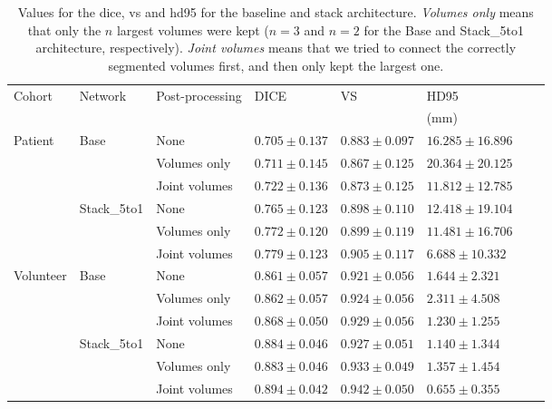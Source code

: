 \begin{table}[htbp]
   \centering
   \caption[Results for Post-processing]{Values for the \acrlong{dice}, \acrlong{vs} and \acrlong{hd95} for the baseline and stack architecture. \textit{Volumes only} means that only the $n$ largest volumes were kept ($n = 3$ and $n = 2$ for the Base and Stack\_5to1 architecture, respectively). \textit{Joint volumes} means that we tried to connect the correctly segmented volumes first, and then only kept the largest one.}
   \begin{tabular}{l*{7}{l}}
      \toprule
      Cohort	& Network	& Post-processing	& DICE				& VS				& HD95\\
      			&					&					&					&					& (mm)\\
      \midrule
      Patient   & Base 	& None & $0.705 \pm 0.137$ & $\mathbf{0.883 \pm 0.097}$ & $16.285 \pm 16.896$\\
                &                	& Volumes only  & $0.711 \pm 0.145$ & $0.867 \pm 0.125$ & $20.364 \pm 20.125$\\
                &                	& Joint volumes & $\mathbf{0.722 \pm 0.136}$ & $0.873 \pm 0.125$ & $\mathbf{11.812 \pm 12.785}$\\
      \cmidrule{2-6}
                & Stack\_5to1 	& None & $0.765 \pm 0.123$ & $0.898 \pm 0.110$ & $12.418 \pm 19.104$\\
                &                	& Volumes only  & $0.772 \pm 0.120$ & $0.899 \pm 0.119$ & $11.481 \pm 16.706$\\
                &                	& Joint volumes      & $\mathbf{0.779 \pm 0.123}$ & $\mathbf{0.905 \pm 0.117}$ & $\mathbf{6.688  \pm 10.332}$\\
      \midrule
      Volunteer & Base 	& None & $0.861 \pm 0.057$ & $0.921 \pm 0.056$ & $1.644  \pm 2.321 $\\
                &                	& Volumes only  & $0.862 \pm 0.057$ & $0.924 \pm 0.056$ & $2.311  \pm 4.508 $\\
                &                	& Joint volumes      & $\mathbf{0.868 \pm 0.050}$ & $\mathbf{0.929 \pm 0.056}$ & $\mathbf{1.230  \pm 1.255}$\\
      \cmidrule{2-6}
                & Stack\_5to1 	& None & $0.884 \pm 0.046$ & $0.927 \pm 0.051$ & $1.140  \pm 1.344 $\\
                &                	& Volumes only  & $0.883 \pm 0.046$ & $0.933 \pm 0.049$ & $1.357  \pm 1.454 $\\
                &                	& Joint volumes      & $\mathbf{0.894 \pm 0.042}$ & $\mathbf{0.942 \pm 0.050}$ & $\mathbf{0.655  \pm 0.355}$\\
      \bottomrule
   \end{tabular}
   \label{tab:results_pp_small}
\end{table}


